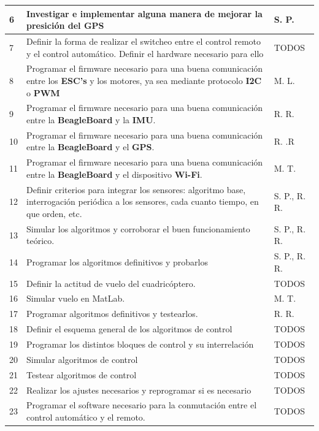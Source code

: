 \documentclass[spanish,12pt,a4paper,titlepage]{report}
\begin{document}
\begin{table}[H]
\begin{tabular}{|p{50pt}|p{250pt}|p{100pt}|} 
\hline
6  & Investigar e implementar alguna manera de mejorar la presición del GPS & S. P. \\ \hline
7  & Definir la forma de realizar el switcheo entre el control remoto y el control automático. Definir el hardware necesario para ello & TODOS \\ \hline
8  & Programar el firmware necesario para una buena comunicación entre los \textbf{ESC's} y los motores, ya sea mediante protocolo \textbf{I2C} o \textbf{PWM} & M. L. \\ \hline
9  & Programar el firmware necesario para una buena comunicación entre la \textbf{BeagleBoard} y la \textbf{IMU}. & R. R. \\ \hline
10  & Programar el firmware necesario para una buena comunicación entre la \textbf{BeagleBoard} y el \textbf{GPS}. & R. .R \\ \hline
11  & Programar el firmware necesario para una buena comunicación entre la \textbf{BeagleBoard} y el dispositivo \textbf{Wi-Fi}. & M. T. \\ \hline
12  & Definir criterios para integrar los sensores: algoritmo base, interrogación periódica a los sensores, cada cuanto tiempo, en que orden, etc. & S. P., R. R. \\ \hline
13  & Simular los algoritmos y corroborar el buen funcionamiento teórico. & S. P., R. R. \\ \hline
14  & Programar los algoritmos definitivos y probarlos & S. P., R. R. \\ \hline
15  & Definir la actitud de vuelo del cuadricóptero. & TODOS \\ \hline
16  & Simular vuelo en MatLab. & M. T. \\ \hline
17  & Programar algoritmos definitivos y testearlos. & R. R. \\ \hline
18  & Definir el esquema general de los algoritmos de control & TODOS \\ \hline
19  & Programar los distintos bloques de control y su interrelación & TODOS \\ \hline
20  & Simular algoritmos de control & TODOS \\ \hline
21  & Testear algoritmos de control & TODOS \\ \hline
22  & Realizar los ajustes necesarios y reprogramar si es necesario & TODOS \\ \hline
23  & Programar el software necesario para la conmutación entre el control automático y el remoto. & TODOS \\ \hline

\end{tabular}
\end{table}
\end{document}
